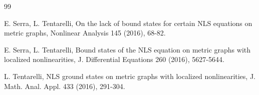 \documentclass[11pt]{amsart}
\numberwithin{equation}{section}
\begin{document}
\begin{thebibliography}{99}


E. Serra, L. Tentarelli, On the lack of bound states for certain NLS equations on metric graphs, Nonlinear Analysis 145 (2016), 68-82.

E. Serra, L. Tentarelli, Bound states of the NLS equation on metric graphs with localized nonlinearities, J. Differential Equations 260 (2016), 5627-5644.

L. Tentarelli, NLS ground states on metric graphs with localized nonlinearities, J. Math. Anal. Appl. 433 (2016), 291-304.

  \end{thebibliography}
  
\end{document}
